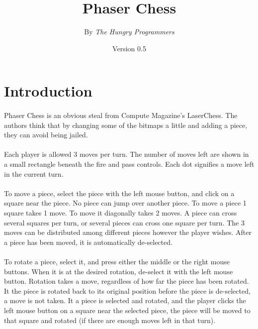 \newcommand{\postscript}[2]
 {\setlength{\epsfxsize}{#2\hsize}
  \centerline{\epsfbox{#1}}}



\title{Phaser Chess}
\author{By \em The Hungry Programmers}
\date{Version 0.5}
\maketitle

\noindent

\setcounter{chapter}{1}

\section*{Introduction}
\paragraph[]{}
Phaser Chess is an obvious steal from Compute Magazine's LaserChess.
The authors think that by changing some of the bitmaps a little and
adding a piece, they can avoid being jailed.

\paragraph[]{}
Each player is allowed 3 moves per turn.  The number of moves left are
shown in a small rectangle beneath the fire and pass controls.  Each
dot signifies a move left in the current turn.

\paragraph[]{}
To move a piece, select the piece with the left mouse button, and
click on a square near the piece.  No piece can jump over another
piece.  To move a piece 1 square takes 1 move.  To move it diagonally
takes 2 moves.  A piece can cross several squares per turn, or several
pieces can cross one square per turn.  The 3 moves can be distributed
among different pieces however the player wishes.  After a piece has
been moved, it is automatically de-selected.

\paragraph[]{}
To rotate a piece, select it, and press either the middle or the right
mouse buttons.  When it is at the desired rotation, de-select it with
the left mouse button.  Rotation takes a move, regardless of how far
the piece has been rotated.  It the piece is rotated back to its
original position before the piece is de-selected, a move is not
taken.  It a piece is selected and rotated, and the player clicks the
left mouse button on a square near the selected piece, the piece will
be moved to that square and rotated (if there are enough moves left in
that turn).


